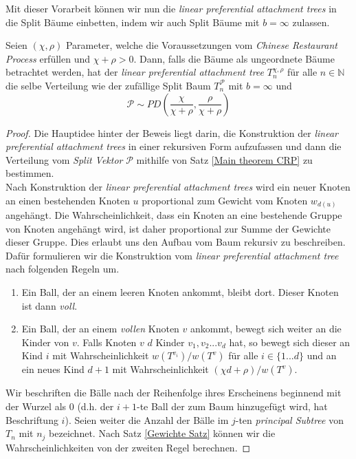 Mit dieser Vorarbeit können wir nun die \textit{linear preferential attachment trees} in die Split Bäume einbetten, indem wir auch Split Bäume mit $b = \infty$ zulassen.
\begin{theorem}
    Seien $(\chi,\rho)$ Parameter, welche die Voraussetzungen vom \textit{Chinese Restaurant Process} erfüllen und $\chi + \rho > 0$. Dann, falls die Bäume als ungeordnete Bäume betrachtet werden, hat der \textit{linear preferential attachment tree} $T_n^{\chi,\rho}$ für alle $n \in \mathbb{N}$ die selbe Verteilung wie der zufällige Split Baum $T^\mathcal{P}_n$ mit $b = \infty$ und 
    \[ 
    \mathcal{P} \sim PD(\frac{\chi}{\chi + \rho}, \frac{\rho}{\chi + \rho})
    \] 
\begin{proof}
    Die Hauptidee hinter der Beweis liegt darin, die Konstruktion der \textit{linear preferential attachment trees} in einer rekursiven Form aufzufassen und dann die Verteilung vom \textit{Split Vektor} $\mathcal{P}$ mithilfe von Satz \ref{Main theorem CRP} zu bestimmen.\\
    Nach Konstruktion der \textit{linear preferential attachment trees} wird ein neuer Knoten an einen bestehenden Knoten $u$ proportional zum Gewicht vom Knoten $w_{d(u)}$ angehängt. Die Wahrscheinlichkeit, dass ein Knoten an eine bestehende Gruppe von Knoten angehängt wird, ist daher proportional zur Summe der Gewichte dieser Gruppe. Dies erlaubt uns den Aufbau vom Baum rekursiv zu beschreiben. Dafür formulieren wir die Konstruktion vom \textit{linear preferential attachment tree} nach folgenden Regeln um.
    \begin{enumerate}
        \item Ein Ball, der an einem leeren Knoten ankommt, bleibt dort. Dieser Knoten ist dann \textit{voll}.
        \item Ein Ball, der an einem \textit{vollen} Knoten $v$ ankommt, bewegt sich weiter an die Kinder von $v$. Falls Knoten $v$ $d$ Kinder $v_1,v_2...v_d$ hat, so bewegt sich dieser an Kind $i$ mit Wahrscheinlichkeit $w(T^{v_i})/w(T^{v})$ für alle $i \in \{1...d\}$ und an ein neues Kind $d+1$ mit Wahrscheinlichkeit $(\chi d + \rho)/w(T^{v})$.
    \end{enumerate} 
    Wir beschriften die Bälle nach der Reihenfolge ihres Erscheinens beginnend mit der Wurzel als $0$ (d.h. der $i+1$-te Ball der zum Baum hinzugefügt wird, hat Beschriftung $i$). Seien weiter die Anzahl der Bälle im $j$-ten \textit{principal Subtree} von $T_n$ mit $n_j$ bezeichnet.
    Nach Satz \ref{Gewichte Satz} können wir die Wahrscheinlichkeiten von der zweiten Regel berechnen.

\end{proof}
\end{theorem}

